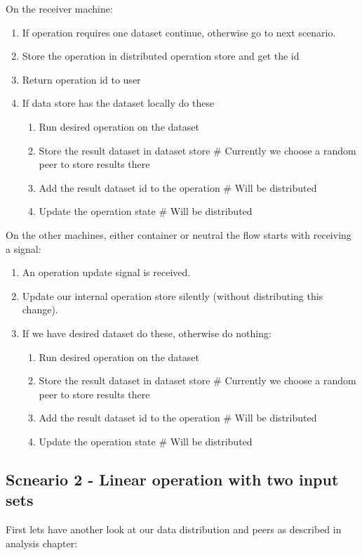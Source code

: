 On the receiver machine:
\begin{enumerate}
\item If operation requires one dataset continue, otherwise go to next scenario.
\item Store the operation in distributed operation store and get the id
\item Return operation id to user
\item If data store has the dataset locally do these
  \begin{enumerate}
  \item Run desired operation on the dataset
  \item Store the result dataset in dataset store \# Currently we choose a random peer to store results there
  \item Add the result dataset id to the operation \# Will be distributed
  \item Update the operation state \# Will be distributed
  \end{enumerate}
\end{enumerate}

On the other machines, either container or neutral the flow starts with receiving a signal:
\begin{enumerate}
\item An operation update signal is received.
\item Update our internal operation store silently (without distributing this change).
\item If we have desired dataset do these, otherwise do nothing:
  \begin{enumerate}
  \item Run desired operation on the dataset
  \item Store the result dataset in dataset store \# Currently we choose a random peer to store results there
  \item Add the result dataset id to the operation \# Will be distributed
  \item Update the operation state \# Will be distributed
  \end{enumerate}
\end{enumerate}

\subsection{Scneario 2 - Linear operation with two input sets}
First lets have another look at our data distribution and peers as described in analysis chapter:

